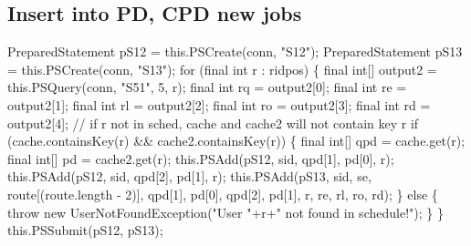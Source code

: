 \subsection{Insert into PD, CPD new jobs}
\nwenddocs{}\endmoddef{}
PreparedStatement pS12 = this.PSCreate(conn, "S12");
PreparedStatement pS13 = this.PSCreate(conn, "S13");
for (final int r : ridpos) \{
  final int[] output2 = this.PSQuery(conn, "S51", 5, r);
  final int rq = output2[0];
  final int re = output2[1];
  final int rl = output2[2];
  final int ro = output2[3];
  final int rd = output2[4];
  // if r not in sched, cache and cache2 will not contain key r
  if (cache.containsKey(r) && cache2.containsKey(r)) \{
    final int[] qpd = cache.get(r);
    final int[]  pd = cache2.get(r);
    this.PSAdd(pS12, sid, qpd[1], pd[0], r);
    this.PSAdd(pS12, sid, qpd[2], pd[1], r);
    this.PSAdd(pS13, sid, se, route[(route.length - 2)], qpd[1], pd[0], qpd[2], pd[1],
          r, re, rl, ro, rd);
  \} else \{
    throw new UserNotFoundException("User "+r+" not found in schedule!");
  \}
\}
this.PSSubmit(pS12, pS13);
\nwendcode{}\nwdocspar

